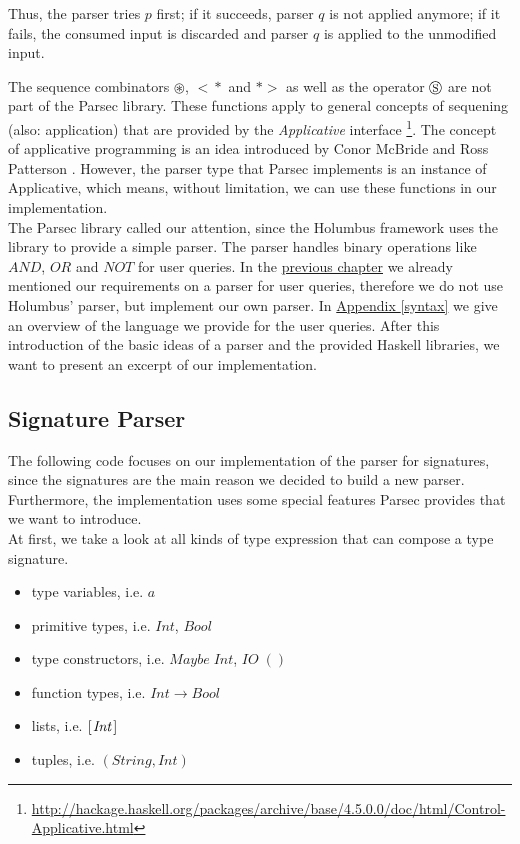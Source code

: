 \documentclass[%
	latex,%
	a4paper,%
	oneside,%
	chapterprefix,%
	headsepline,%
	12pt%
]{scrbook}
\newcommand{\Conid}[1]{\mathit{#1}}
\newcommand{\Varid}[1]{\mathit{#1}}
\begin{document}
Thus, the parser tries \ensuremath{\Varid{p}} first; if it succeeds, parser \ensuremath{\Varid{q}} is not
applied anymore; if it fails, the consumed input is discarded and
parser \ensuremath{\Varid{q}} is applied to the unmodified input. %

The sequence combinators \ensuremath{\circledast}, \ensuremath{<\!\!\!*} and \ensuremath{*\!\!\!>} as well as the operator
\ensuremath{\circledS} are not part of the Parsec library. %
These functions apply to general concepts of sequening (also:
application) that are provided by the \emph{Applicative} interface
\footnote{\url{http://hackage.haskell.org/packages/archive/base/4.5.0.0/doc/html/Control-Applicative.html}}. %
The concept of applicative programming is an idea introduced by Conor
McBride and Ross Patterson \cite{applicative}. %
However, the parser type that Parsec implements is an instance of
Applicative, which means, without limitation, we can use these functions in our
implementation. \\ %

The Parsec library called our attention, since the Holumbus framework
uses the library to provide a simple parser. %
The parser handles binary operations like \ensuremath{\Conid{AND}}, \ensuremath{\Conid{OR}} and \ensuremath{\Conid{NOT}} for
user queries. %
In the \hyperref[analysis:parser]{previous chapter} we already
mentioned our requirements on a parser for user queries, therefore we
do not use Holumbus' parser, but implement our own parser. %
In \hyperref[syntax]{Appendix \ref{syntax}} we give an overview of
the language we provide for the user queries. %
After this introduction of the basic ideas of a parser and the provided
Haskell libraries, we want to present an excerpt of our
implementation. \\ %

\subsection{Signature Parser}

The following code focuses on our implementation of the
parser for signatures, since the signatures are the main reason we
decided to build a new parser. %
Furthermore, the implementation uses some special features Parsec
provides that we want to introduce. \\ %

At first, we take a look at all kinds of type expression that can
compose a type signature. %

\begin{itemize}
\item type variables, i.e. \ensuremath{\Varid{a}}
\item primitive types, i.e. \ensuremath{\Conid{Int}}, \ensuremath{\Conid{Bool}}
\item type constructors, i.e. \ensuremath{\Conid{Maybe}\;\Conid{Int}}, \ensuremath{\Conid{IO}\;()}
\item function types, i.e. \ensuremath{\Conid{Int}\to \Conid{Bool}}
\item lists, i.e. \ensuremath{[\mskip1.5mu \Conid{Int}\mskip1.5mu]}
\item tuples, i.e. \ensuremath{(\Conid{String},\Conid{Int})}
\end{itemize}
\end{document}
